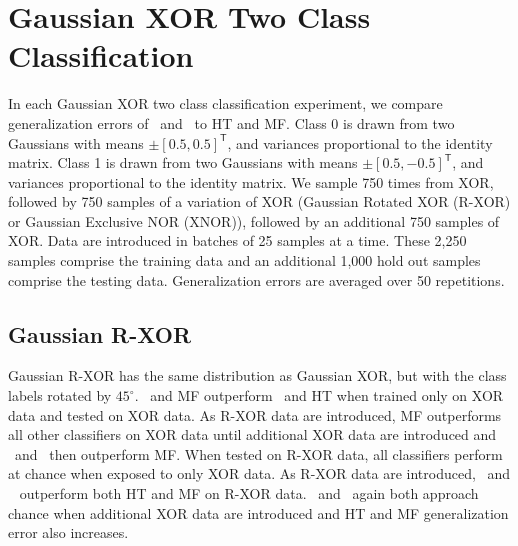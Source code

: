 

\section{Gaussian XOR Two Class Classification} In each Gaussian XOR two class classification  experiment, we compare generalization errors of \SDT~and \SDF~to HT and MF. Class 0 is drawn from two Gaussians with means $\pm [0.5,0.5]^\mathsf{T}$, and variances proportional to the identity matrix. Class 1 is drawn from two Gaussians with  means $\pm [0.5,-0.5]^\mathsf{T}$, and variances proportional to the identity matrix. We sample 750 times from XOR, followed by 750 samples of a variation of XOR (Gaussian Rotated XOR (R-XOR) or Gaussian Exclusive NOR (XNOR)), followed by an additional 750 samples of XOR. Data are introduced in batches of 25 samples at a time. These 2,250 samples comprise the training data and an additional 1,000 hold out samples comprise the testing data. Generalization errors are averaged over 50 repetitions.

\subsection{Gaussian R-XOR} Gaussian R-XOR has the same distribution as Gaussian XOR, but with the class labels rotated by $45^\circ$. \SDF~and MF outperform \SDT~and HT when trained only on XOR data and tested on XOR data. As R-XOR data are introduced, MF outperforms all other classifiers on XOR data until additional XOR data are introduced and \SDF~and \SDT~then outperform MF. When tested on R-XOR data, all classifiers perform at chance when exposed to only XOR data. As R-XOR data are introduced, \SDT~and \SDF~ outperform both HT and MF on R-XOR data. \SDF~and \SDT~again both approach chance when additional XOR data are introduced and HT and MF generalization error also increases.

